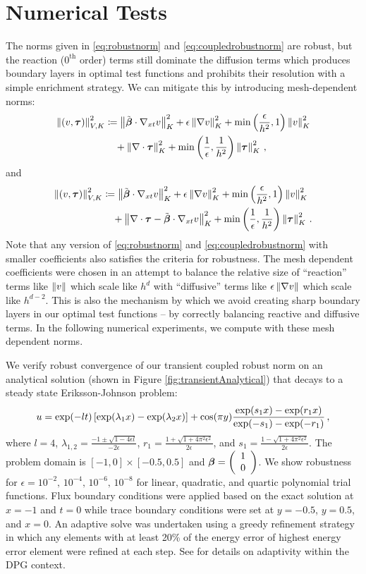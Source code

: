 \documentclass[Dissertation.tex]{subfiles}
\begin{document}
\section{Numerical Tests}
The norms given in \eqref{eq:robustnorm} and \eqref{eq:coupledrobustnorm} are robust, 
but the reaction ($0^\text{th}$ order) terms still dominate the diffusion terms which 
produces boundary layers in optimal test functions and
prohibits their resolution with a simple enrichment strategy.
We can mitigate this by introducing mesh-dependent norms:
\begin{align}
\label{eq:meshrobustnorm}
\left\| \left( v,\boldsymbol\tau \right) \right\|_{V,K}^2 &\coloneqq
\left\| \tilde{\boldsymbol\beta}\cdot\nabla_{xt} v \right\|_K^2
+ \epsilon\left\| \nabla v \right\|_K^2
+ \min\left( \frac{\epsilon}{h^2},1 \right)\left\| v \right\|^2_K
\\\nonumber&\quad
+ \left\| \nabla\cdot \boldsymbol\tau \right\|_K^2
+ \min\left( \frac{1}{\epsilon},\frac{1}{h^2} \right)\left\| \boldsymbol\tau \right\|_K^2\,,
\end{align}
and
\begin{align}
\label{eq:meshcoupledrobustnorm}
\left\| \left( v,\boldsymbol\tau \right) \right\|_{V,K}^2 &\coloneqq
\left\| \tilde{\boldsymbol\beta}\cdot\nabla_{xt} v \right\|_K^2
+ \epsilon\left\| \nabla v \right\|_K^2
+ \min\left( \frac{\epsilon}{h^2},1 \right)\left\| v \right\|^2_K
\\\nonumber&\quad
+ \left\| \nabla\cdot \boldsymbol\tau - \tilde{\boldsymbol\beta}\cdot\nabla_{xt} v \right\|_K^2
+ \min\left( \frac{1}{\epsilon},\frac{1}{h^2} \right)\left\| \boldsymbol\tau \right\|_K^2\,.
\end{align}
Note that any version of \eqref{eq:robustnorm} and \eqref{eq:coupledrobustnorm} with smaller coefficients also satisfies the criteria for robustness.
The mesh dependent coefficients were chosen in an attempt to balance the relative size of ``reaction'' terms like $\left\| v \right\|$ which scale like $h^{d}$
with ``diffusive'' terms like $\epsilon\left\| \nabla v \right\|$ which scale like $h^{d-2}$.
This is also the mechanism by which we avoid creating sharp boundary layers in our optimal test functions -- by correctly balancing reactive and diffusive terms.
In the following numerical experiments, we compute with these mesh dependent norms.

We verify robust convergence of our transient coupled robust norm on an analytical solution (shown in Figure \ref{fig:transientAnalytical}) that decays to a steady state Eriksson-Johnson problem:
\[
u=\exp(-lt)\left[ \exp(\lambda_1 x)-\exp(\lambda_2 x) \right]+
\cos(\pi y)\frac{\exp(s_1x)-\exp(r_1x)}{\exp(-s_1)-\exp(-r_1)}\,,
\]
where $l=4$,
$\lambda_{1,2}=\frac{-1\pm\sqrt{1-4\epsilon l}}{-2\epsilon}$,
$r_1=\frac{1+\sqrt{1+4\pi^2\epsilon^2}}{2\epsilon}$, and
$s_1=\frac{1-\sqrt{1+4\pi^2\epsilon^2}}{2\epsilon}$.
The problem domain is $[-1,0]\times[-0.5,0.5]$ and $\boldsymbol\beta=\left( \begin{array}{c} 1\\ 0\\ \end{array} \right)$.
We show robustness for $\epsilon=10^{-2},\,10^{-4},\,10^{-6},\,10^{-8}$ for linear, quadratic, and quartic polynomial trial functions.
Flux boundary conditions were applied based on the exact solution at $x=-1$ and $t=0$ 
while trace boundary conditions were set at $y=-0.5$, $y=0.5$, and $x=0$.
An adaptive solve was undertaken using a greedy refinement strategy in which any elements with at least 20\% of the energy error 
of highest energy error element were refined at each step. See \cite{DPG3} for details on adaptivity within the DPG context.
\end{document}

